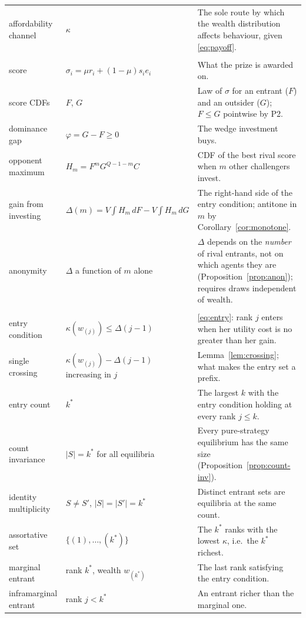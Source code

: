 \documentclass[11pt]{article}
\begin{document}
\begin{longtable}{@{}>{\raggedright\arraybackslash}p{}>{\raggedright\arraybackslash}p{}>{\raggedright\arraybackslash}p{}@{}}
affordability channel & $\kappa$ & The sole route by which the wealth
  distribution affects behaviour, given \eqref{eq:payoff}. \\[4pt]
\multicolumn{3}{@{}l}{\emph{Scores and gains}}\\[2pt]
score & $\sigma_i=\mu r_i+(1-\mu)s_ie_i$ & What the prize is awarded on. \\
score CDFs & $F$, $G$ & Law of $\sigma$ for an entrant ($F$) and an
  outsider ($G$); $F\le G$ pointwise by P2. \\
dominance gap & $\varphi=G-F\ge0$ & The wedge investment buys. \\
opponent maximum & $H_m=F^mG^{Q-1-m}C$ & CDF of the best rival score when
  $m$ other challengers invest. \\
gain from investing & $\Delta(m)=V\!\int\! H_m\,dF-V\!\int\! H_m\,dG$ &
  The right-hand side of the entry condition; antitone in $m$ by
  Corollary~\ref{cor:monotone}. \\
anonymity & $\Delta$ a function of $m$ alone & $\Delta$ depends on the
  \emph{number} of rival entrants, not on which agents they are
  (Proposition~\ref{prop:anon}); requires draws independent of wealth. \\[4pt]
\multicolumn{3}{@{}l}{\emph{Equilibrium objects}}\\[2pt]
entry condition & $\kappa(w_{(j)})\le\Delta(j-1)$ & \eqref{eq:entry}: rank
  $j$ enters when her utility cost is no greater than her gain. \\
single crossing & $\kappa(w_{(j)})-\Delta(j-1)$ increasing in $j$ &
  Lemma~\ref{lem:crossing}; what makes the entry set a prefix. \\
entry count & $k^*$ & The largest $k$ with the entry condition holding at
  every rank $j\le k$. \\
count invariance & $|S|=k^*$ for all equilibria & Every pure-strategy
  equilibrium has the same size
  (Proposition~\ref{prop:count-inv}). \\
identity multiplicity & $S\ne S'$, $|S|=|S'|=k^*$ & Distinct entrant sets
  are equilibria at the same count. \\
assortative set & $\{(1),\dots,(k^*)\}$ & The $k^*$ ranks with the lowest
  $\kappa$, i.e.\ the $k^*$ richest. \\
marginal entrant & rank $k^*$, wealth $w_{(k^*)}$ & The last rank
  satisfying the entry condition. \\
inframarginal entrant & rank $j<k^*$ & An entrant richer than the marginal
  one. \\

\end{longtable}
\end{document}
